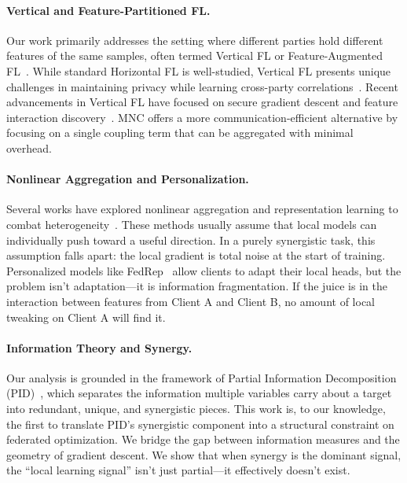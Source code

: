 \documentclass{article}
\theoremstyle{plain}
\theoremstyle{definition}
\begin{document}
\paragraph{Vertical and Feature-Partitioned FL.} Our work primarily addresses the setting where different parties hold different features of the same samples, often termed Vertical FL or Feature-Augmented FL~\cite{ye2023survey,gao2023vfl,ye2023heterofl}. While standard Horizontal FL is well-studied, Vertical FL presents unique challenges in maintaining privacy while learning cross-party correlations~\cite{cheng2021secureboost,he2023theory_vfl,cheng2021vfl}. Recent advancements in Vertical FL have focused on secure gradient descent and feature interaction discovery~\cite{wang2023interactions,valdeira2025laser}. MNC offers a more communication-efficient alternative by focusing on a single coupling term that can be aggregated with minimal overhead.

\paragraph{Nonlinear Aggregation and Personalization.} Several works have explored nonlinear aggregation and representation learning to combat heterogeneity~\cite{li2021model,zhu2021data,li2021ditto,dinh2020pfedme,collins2021fedrep,fallah2020perfedavg,ye2023heterofl,tan2023federated_gnn,liu2024promptfl}. These methods usually assume that local models can individually push toward a useful direction. In a purely synergistic task, this assumption falls apart: the local gradient is total noise at the start of training.
 Personalized models like FedRep~\cite{collins2021fedrep} allow clients to adapt their local heads, but the problem isn't adaptation—it is information fragmentation. If the juice is in the interaction between features from Client A and Client B, no amount of local tweaking on Client A will find it.

\paragraph{Information Theory and Synergy.} Our analysis is grounded in the framework of Partial Information Decomposition (PID)~\cite{williams2010pid}, which separates the information multiple variables carry about a target into redundant, unique, and synergistic pieces. This work is, to our knowledge, the first to translate PID's synergistic component into a structural constraint on federated optimization. We bridge the gap between information measures and the geometry of gradient descent. We show that when synergy is the dominant signal, the ``local learning signal'' isn't just partial—it effectively doesn't exist.
\end{document}

